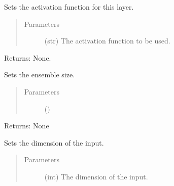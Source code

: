 \documentclass[letterpaper,10pt,english,openany,oneside]{sphinxmanual}
\begin{document}
\begin{fulllineitems}
\begin{fulllineitems}
\label{\detokenize{_modules/layers:layers.FC.FC.set_activation}}
Sets the activation function for this layer.
\begin{quote}\begin{description}
\item[{Parameters}] \leavevmode
{} \textendash{} (str) The activation function to be used.

\end{description}\end{quote}

Returns: None.

\end{fulllineitems}


\begin{fulllineitems}
\label{\detokenize{_modules/layers:layers.FC.FC.set_ensemble_size}}
Sets the ensemble size.
\begin{quote}\begin{description}
\item[{Parameters}] \leavevmode
{} () \textendash{} 

\end{description}\end{quote}

Returns: None

\end{fulllineitems}


\begin{fulllineitems}
\label{\detokenize{_modules/layers:layers.FC.FC.set_input_dim}}
Sets the dimension of the input.
\begin{quote}\begin{description}
\item[{Parameters}] \leavevmode
{} \textendash{} (int) The dimension of the input.


\end{description}
\end{quote}
\end{fulllineitems}
\end{fulllineitems}
\end{document}
